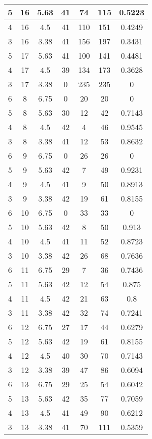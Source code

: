 \documentclass[letterpaper, 12pt]{article}
\begin{document}
\begin{longtable}{|c|c|c|c|c|c|c|}
\hline
5 & 16 & 5.63 & 41 & 74 & 115 & 0.5223 \\
\hline
4 & 16 & 4.5 & 41 & 110 & 151 & 0.4249 \\
\hline
3 & 16 & 3.38 & 41 & 156 & 197 & 0.3431 \\
\hline
5 & 17 & 5.63 & 41 & 100 & 141 & 0.4481 \\
\hline
4 & 17 & 4.5 & 39 & 134 & 173 & 0.3628 \\
\hline
3 & 17 & 3.38 & 0 & 235 & 235 & 0 \\
\hline
6 & 8 & 6.75 & 0 & 20 & 20 & 0 \\
\hline
5 & 8 & 5.63 & 30 & 12 & 42 & 0.7143 \\
\hline
4 & 8 & 4.5 & 42 & 4 & 46 & 0.9545 \\
\hline
3 & 8 & 3.38 & 41 & 12 & 53 & 0.8632 \\
\hline
6 & 9 & 6.75 & 0 & 26 & 26 & 0 \\
\hline
5 & 9 & 5.63 & 42 & 7 & 49 & 0.9231 \\
\hline
4 & 9 & 4.5 & 41 & 9 & 50 & 0.8913 \\
\hline
3 & 9 & 3.38 & 42 & 19 & 61 & 0.8155 \\
\hline
6 & 10 & 6.75 & 0 & 33 & 33 & 0 \\
\hline
5 & 10 & 5.63 & 42 & 8 & 50 & 0.913 \\
\hline
4 & 10 & 4.5 & 41 & 11 & 52 & 0.8723 \\
\hline
3 & 10 & 3.38 & 42 & 26 & 68 & 0.7636 \\
\hline
6 & 11 & 6.75 & 29 & 7 & 36 & 0.7436 \\
\hline
5 & 11 & 5.63 & 42 & 12 & 54 & 0.875 \\
\hline
4 & 11 & 4.5 & 42 & 21 & 63 & 0.8 \\
\hline
3 & 11 & 3.38 & 42 & 32 & 74 & 0.7241 \\
\hline
6 & 12 & 6.75 & 27 & 17 & 44 & 0.6279 \\
\hline
5 & 12 & 5.63 & 42 & 19 & 61 & 0.8155 \\
\hline
4 & 12 & 4.5 & 40 & 30 & 70 & 0.7143 \\
\hline
3 & 12 & 3.38 & 39 & 47 & 86 & 0.6094 \\
\hline
6 & 13 & 6.75 & 29 & 25 & 54 & 0.6042 \\
\hline
5 & 13 & 5.63 & 42 & 35 & 77 & 0.7059 \\
\hline
4 & 13 & 4.5 & 41 & 49 & 90 & 0.6212 \\
\hline
3 & 13 & 3.38 & 41 & 70 & 111 & 0.5359 \\

\end{longtable}
\end{document}
